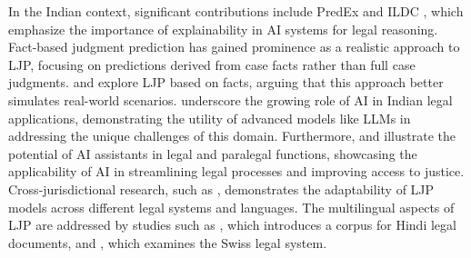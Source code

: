 In the Indian context, significant contributions include PredEx \cite{nigam2024legaljudgmentreimaginedpredex} and ILDC \cite{malik-etal-2021-ildc}, which emphasize the importance of explainability in AI systems for legal reasoning. Fact-based judgment prediction has gained prominence as a realistic approach to LJP, focusing on predictions derived from case facts rather than full case judgments. \citet{nigam-etal-2024-rethinking} and \citet{10.1145/3632754.3632765} explore LJP based on facts, arguing that this approach better simulates real-world scenarios. \citet{nigam2022nigam, nigam-etal-2023-nonet, nigam2023legal, malik2021semantic, ganguly2023legal, ghosh2023report} underscore the growing role of AI in Indian legal applications, demonstrating the utility of advanced models like LLMs in addressing the unique challenges of this domain. Furthermore, \citet{tiwari2024aalap} and \citet{huang2023lawyer} illustrate the potential of AI assistants in legal and paralegal functions, showcasing the applicability of AI in streamlining legal processes and improving access to justice.
%
Cross-jurisdictional research, such as \cite{zhao-etal-2018-learning}, demonstrates the adaptability of LJP models across different legal systems and languages. The multilingual aspects of LJP are addressed by studies such as \cite{kapoor-etal-2022-hldc}, which introduces a corpus for Hindi legal documents, and \cite{niklaus2021swiss}, which examines the Swiss legal system.
